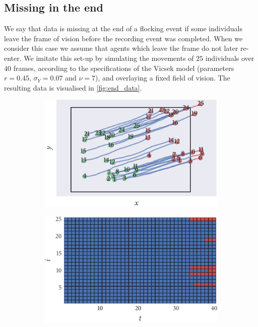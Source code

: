 \subsection{Missing in the end}
\label{ssec:end_missing}

We say that data is missing at the end of a flocking event if some individuals
leave the frame of vision before the recording event was completed. When we
consider this case we assume that agents which leave the frame do not later
re-enter. We imitate this set-up by simulating the movements of $25$
individuals over $40$ frames, according to the specifications of the Vicsek
model (parameters $r=0.45$, $\sigma_Y=0.07$ and $\nu=7$), and overlaying a fixed
field of vision. The resulting data is visualised in \cref{fig:end_data}.

\begin{figure}[tbp]
  \begin{subfigure}[b]{0.5\textwidth}
    \includegraphics{end/data.pdf}
    \caption{}
    \label{subfig:end_data}
  \end{subfigure}%
  \begin{subfigure}[b]{0.5\textwidth}
    \includegraphics{end/missing_array.pdf}

\end{subfigure}
\end{figure}
